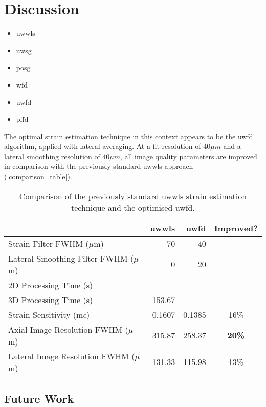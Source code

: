 \chapter{Discussion}

\begin{itemize}
\item \ac{uwwls}
\item \ac{uwsg}
\item \ac{posg}
\item \ac{wfd}
\item \ac{uwfd}
\item \ac{pffd}
\end{itemize}

The optimal strain estimation technique in this context appears to be the \ac{uwfd} algorithm, applied with lateral averaging. At a fit resolution of $40\mu m$ and a lateral smoothing resolution of $40\mu m$, all image quality parameters are improved in comparison with the previously standard \ac{uwwls} approach (\autoref{comparison_table}).

\begin{table}[h]
	\begin{tabularx}{\textwidth}{Yrrc}
		\toprule
		& \textbf{\ac{uwwls}} & \textbf{\ac{uwfd}} & \textbf{Improved?}\\
		\midrule 
		Strain Filter FWHM ($\mu$m) & 70 & 40 \\
		Lateral Smoothing Filter FWHM ($\mu$m) & 0 & 20 \\
		\midrule
		2D Processing Time (s) & & \\
		3D Processing Time (s) & 153.67 & \\
		Strain Sensitivity (m$\epsilon$) & 0.1607 & 0.1385 & 16\% \\
		Axial Image Resolution FWHM ($\mu$m) & 315.87 & 258.37 & \textbf{20\%} \\
		Lateral Image Resolution FWHM ($\mu$m) & 131.33 & 115.98 & 13\% \\
		\bottomrule
	\end{tabularx}
	\caption{Comparison of the previously standard \ac{uwwls} strain estimation technique and the optimised \ac{uwfd}.}
	\label{comparison_table}
\end{table}

\section{Future Work}

